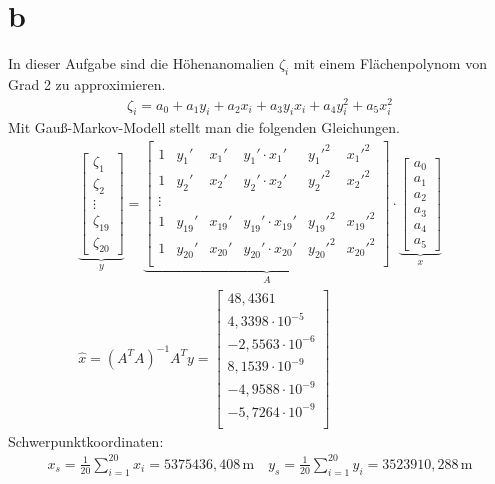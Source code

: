 \documentclass[12pt
,headinclude
,headsepline
,bibtotocnumbered
]{scrartcl}
\begin{document}
\section{b}
In dieser Aufgabe sind die Höhenanomalien $\zeta_i$ mit einem Flächenpolynom von Grad 2 zu approximieren.
\begin{align*}
	\zeta_i=a_0+a_1y_i+a_2x_i+a_3y_ix_i+a_4y_i^2+a_5x_i^2                                           
\end{align*}
Mit Gauß-Markov-Modell stellt man die folgenden Gleichungen.
\begin{gather*}
	\underbrace{\begin{bmatrix}
			\zeta_1 \\
			\zeta_2 \\
			\vdots \\
			\zeta_{19} \\
			\zeta_{20}
	\end{bmatrix}}_{\text{$y$}} = \underbrace{\begin{bmatrix}
			1 & y_1' & x_1' & y_1' \cdot x_1' & y_1'^2 & x_1'^2 \\
			1 & y_2' & x_2' & y_2' \cdot x_2' & y_2'^2 & x_2'^2 \\
			\vdots \\
			1 & y_{19}' & x_{19}' & y_{19}' \cdot x_{19}' & y_{19}'^2 & x_{19}'^2 \\
			1 & y_{20}' & x_{20}' & y_{20}' \cdot x_{20}' & y_{20}'^2 & x_{20}'^2 \\
	\end{bmatrix}}_{\text{$A$}} \cdot \underbrace{\begin{bmatrix}
			a_0 \\
			a_1 \\
			a_2 \\
			a_3 \\
			a_4 \\
			a_5
	\end{bmatrix}}_{\text{$x$}} \\
	\hat{x} = (A^{T}A)^{-1}A^{T}y = \begin{bmatrix}
		48,4361 \\
		4,3398 \cdot 10^{-5} \\
		-2,5563 \cdot 10^{-6} \\
		8,1539 \cdot 10^{-9} \\
		-4,9588 \cdot 10^{-9} \\
		-5,7264 \cdot 10^{-9} \\
	\end{bmatrix}
\end{gather*}
Schwerpunktkoordinaten:
\begin{align*}
	x_s=\frac{1}{20}\sum_{i=1}^{20}x_i=5375436,408\,\mathrm{m}\quad
	y_s = \frac{1}{20} \sum_{i=1}^{20} y_i = 3523910,288\,\mathrm{m}
\end{align*}
\end{document}

